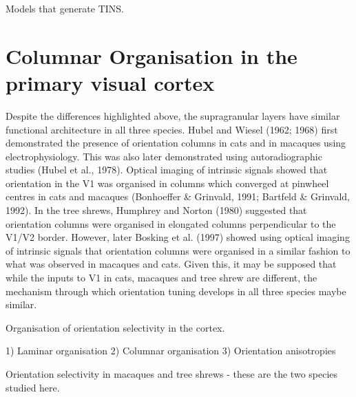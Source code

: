 Models that generate
TINS.
\section{Columnar Organisation in the primary visual cortex}
Despite the differences highlighted above, the supragranular layers have similar functional architecture in all three species. Hubel and Wiesel (1962; 1968) first demonstrated the presence of orientation columns in cats and in macaques using electrophysiology. This was also later demonstrated using autoradiographic studies (Hubel et al., 1978). Optical imaging of intrinsic signals showed that orientation in the V1 was organised in columns which converged at pinwheel centres in cats and macaques (Bonhoeffer \& Grinvald, 1991; Bartfeld \& Grinvald, 1992). In the tree shrews, Humphrey and Norton (1980) suggested that orientation columns were organised in elongated columns perpendicular to the V1/V2 border. However, later Bosking et al. (1997) showed using optical imaging of intrinsic signals that orientation columns were organised in a similar fashion to what was observed in macaques and cats. Given this, it may be supposed that while the inputs to V1 in cats, macaques and tree shrew are different, the mechanism through which orientation tuning develops in all three species maybe similar. 

Organisation of orientation selectivity in the cortex.

1) Laminar organisation
2) Columnar organisation
3) Orientation anisotropies

Orientation selectivity in macaques and tree shrews - these are the two species studied here.

